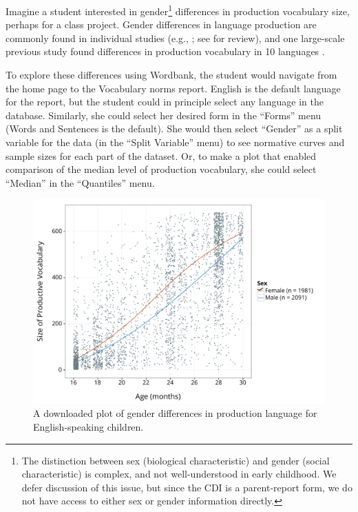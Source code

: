 \documentclass[man,noapacite]{apa}
\begin{document}
Imagine a student interested in gender\footnote{The distinction between sex (biological characteristic) and gender (social characteristic) is complex, and not well-understood in early childhood. We defer discussion of this issue, but since the CDI is a parent-report form, we do not have access to either sex or gender information directly.} differences in production vocabulary size, perhaps for a class project. Gender differences in language production are commonly found in individual studies (e.g., ; see  for review), and one large-scale previous study found differences in production vocabulary in 10 languages \cite{eriksson2012}. 

To explore these differences using Wordbank, the student would navigate from the home page to the Vocabulary norms report. English is the default language for the report, but the student could in principle select any language in the database. Similarly, she could select her desired form in the ``Forms'' menu (Words and Sentences is the default). She would then select ``Gender'' as a split variable for the data (in the ``Split Variable'' menu) to see normative curves and sample sizes for each part of the dataset. Or, to make a plot that enabled comparison of the median level of production vocabulary, she could select ``Median'' in the ``Quantiles'' menu. 

\begin{figure}[h!]
\includegraphics[width=6in]{figures/vocabulary_norms.pdf}
\caption{\label{fig:gender1} A downloaded plot of gender differences in production language for English-speaking children.}
\end{figure}
\end{document}
